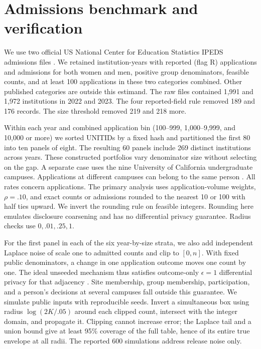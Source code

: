 \documentclass[11pt]{article}
\begin{document}
\section{Admissions benchmark and verification}\label{app:admissions}
We use two official US National Center for Education Statistics IPEDS admissions files \cite{ipeds}. We retained institution-years with reported (flag R) applications and admissions for both women and men, positive group denominators, feasible counts, and at least 100 applications in these two categories combined. Other published categories are outside this estimand. The raw files contained 1,991 and 1,972 institutions in 2022 and 2023. The four reported-field rule removed 189 and 176 records. The size threshold removed 219 and 218 more.

Within each year and combined application bin (100--999, 1,000--9,999, and 10,000 or more) we sorted UNITIDs by a fixed hash and partitioned the first 80 into ten panels of eight. The resulting 60 panels include 269 distinct institutions across years. These constructed portfolios vary denominator size without selecting on the gap. A separate case uses the nine University of California undergraduate campuses. Applications at different campuses can belong to the same person \cite{uc}. All rates concern applications. The primary analysis uses application-volume weights, $\rho=.10$, and exact counts or admissions rounded to the nearest 10 or 100 with half ties upward. We invert the rounding rule on feasible integers. Rounding here emulates disclosure coarsening and has no differential privacy guarantee. Radius checks use $0,.01,.25,1$.

For the first panel in each of the six year-by-size strata, we also add independent Laplace noise of scale one to admitted counts and clip to $[0,n]$. With fixed public denominators, a change in one application outcome moves one count by one. The ideal unseeded mechanism thus satisfies outcome-only $\epsilon=1$ differential privacy for that adjacency \cite{dwork}. Site membership, group membership, participation, and a person's decisions at several campuses fall outside this guarantee. We simulate public inputs with reproducible seeds. Invert a simultaneous box using radius $\log(2K/.05)$ around each clipped count, intersect with the integer domain, and propagate it. Clipping cannot increase error; the Laplace tail and a union bound give at least 95\% coverage of the full table, hence of its entire true envelope at all radii. The reported 600 simulations address release noise only.
\end{document}

